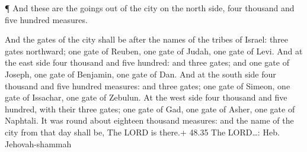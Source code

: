  ¶ And these are the goings out of the city on the north
side, four thousand and five hundred measures.

 And the gates of the city shall be after the names of the
tribes of Israel: three gates northward; one gate of Reuben, one gate of
Judah, one gate of Levi.  And at the east side four
thousand and five hundred: and three gates; and one gate of Joseph, one
gate of Benjamin, one gate of Dan.  And at the south side
four thousand and five hundred measures: and three gates; one gate of
Simeon, one gate of Issachar, one gate of Zebulun.  At the
west side four thousand and five hundred, with their three gates; one
gate of Gad, one gate of Asher, one gate of Naphtali.  It
was round about eighteen thousand measures: and the name of the city
from that day shall be, The LORD is there.+ 48.35 The LORD\ldots: Heb.
Jehovah-shammah
